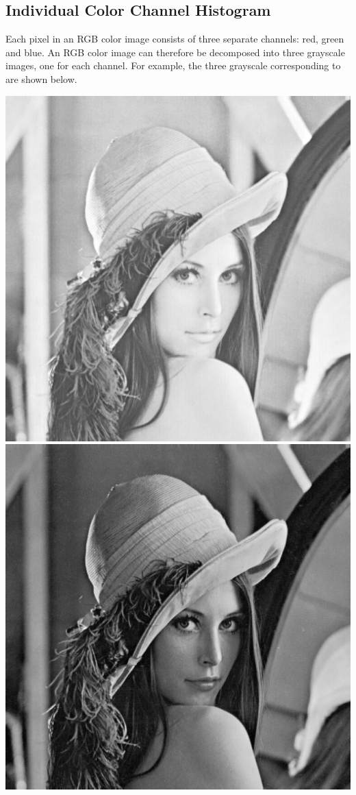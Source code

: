 \documentclass{book}
\begin{document}
\subsection{Individual Color Channel Histogram}
Each pixel in an RGB color image consists of three separate channels: red, green and blue. An RGB color image can therefore be decomposed into three grayscale images, one for each channel. For example, the three grayscale corresponding to  are shown below.
\begin{center}
\includegraphics[scale=0.2]{lena-red.png}
\includegraphics[scale=0.2]{lena-green.png}

\end{center}
\end{document}

